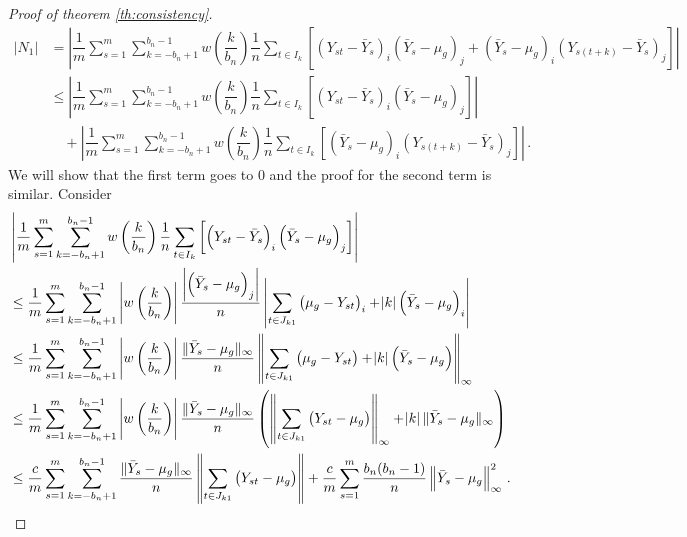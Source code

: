 \documentclass[11pt]{article}
\theoremstyle{remark}
\begin{document}
\begin{proof}[Proof of theorem \ref{th:consistency}]
%
\begin{align*}
|N_1| & = \left|\dfrac{1}{m}\sum_{s=1}^{m}  \sum_{k=-b_n+1}^{b_n-1}  w\left(\dfrac{k}{b_n}\right)\dfrac{1}{n}  \sum_{t \in I_k}  \left[ \left(Y_{st} - \bar{Y}_s \right)_i  \left(\bar{Y}_s - \mu_g \right)_j + \left(\bar{Y}_s - \mu_g \right)_i  \left(Y_{s(t+k)} - \bar{Y}_s \right)_j\right] \right|\\
& \leq \left| \dfrac{1}{m}\sum_{s=1}^{m}\sum_{k=-b_n+1}^{b_n-1}w\left(\dfrac{k}{b_n}\right)\dfrac{1}{n}\sum_{t \in I_k}\left[ \left(Y_{st} - \bar{Y}_s \right)_i  \left(\bar{Y}_s - \mu_g \right)_j \right] \right| \\ 
& \quad + \left| \dfrac{1}{m}\sum_{s=1}^{m}\sum_{k=-b_n+1}^{b_n-1}w\left(\dfrac{k}{b_n}\right)\dfrac{1}{n}\sum_{t \in I_k}\left[ \left(\bar{Y}_s - \mu_g \right)_i  \left(Y_{s(t+k)} - \bar{Y}_s \right)_j\right] \right|\,.
\end{align*}
%
We will show that the first term goes to 0 and the proof for the second term is similar. Consider
\begin{align*}
    & \left| \dfrac{1}{m}\sum_{s=1}^{m}\sum_{k=-b_n+1}^{b_n-1}w\left(\dfrac{k}{b_n}\right)\dfrac{1}{n}\sum_{t \in I_k}\left[ \left(Y_{st} - \bar{Y}_s \right)_i  \left(\bar{Y}_s - \mu_g \right)_j \right] \right| \\
    & \leq \dfrac{1}{m}\sum_{s=1}^{m}\sum_{k=-b_n+1}^{b_n-1} \left| w\left(\dfrac{k}{b_n}\right) \right| \dfrac{ \left| \left(\bar{Y}_s - \mu_g \right)_j \right| }{n} \left| \sum_{t \in J_{k1}} \left(\mu_g - Y_{st} \right)_i  + \abs{k} \left(\bar{Y}_s - \mu_g \right)_i \right|\\
    & \leq \dfrac{1}{m}\sum_{s=1}^{m}\sum_{k=-b_n+1}^{b_n-1}  \left|w\left(\dfrac{k}{b_n}\right) \right|\dfrac{\|\bar{Y}_s - \mu_g\|_{\infty}}{n} \left\|\sum_{t \in J_{k1}} \left(\mu_g - Y_{st} \right) + \abs{k} \left(\bar{Y}_s - \mu_g \right)\right\|_{\infty}\\
    & \leq \dfrac{1}{m}\sum_{s=1}^{m}\sum_{k=-b_n+1}^{b_n-1} \left|w\left(\dfrac{k}{b_n}\right) \right|\dfrac{\|\bar{Y}_s - \mu_g\|_{\infty}}{n} \left(\left\|\sum_{t \in J_{k1}}  \left(Y_{st} - \mu_g \right)\right\|_{\infty} + \abs{k}\|\bar{Y}_s - \mu_g\|_{\infty} \right)\\
    & \leq \dfrac{c}{m}\sum_{s=1}^{m}\sum_{k=-b_n+1}^{b_n-1}\dfrac{\|\bar{Y}_s - \mu_g\|_{\infty}}{n} \left\|\sum_{t \in J_{k1}} \left(Y_{st} - \mu_g\right) \right\| + \dfrac{c}{m}\sum\limits_{s=1}^{m} \dfrac{b_n(b_n-1)}{n} \left \|\bar{Y}_s - \mu_g \right \|_{\infty}^2\,.
\end{align*}


\end{proof}
\end{document}
